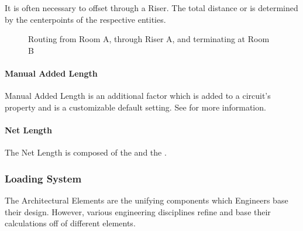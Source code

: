 \documentclass[letterpaper,10pt,english]{sphinxmanual}
\begin{document}
It is often necessary to offset through a Riser.  The total distance or {\hyperref[\detokenize{docs/userguide/index-user_guide:net-length}]{}} is determined by the centerpoints of the respective entities.

\begin{figure}[H]
\centering
\capstart

\noindent{}
\caption{Routing from Room A, through Riser A, and terminating at Room B}\label{\detokenize{docs/userguide/index-user_guide:id26}}\end{figure}


\paragraph{Manual Added Length}
\label{\detokenize{docs/userguide/index-user_guide:manual-added-length}}\label{\detokenize{docs/userguide/index-user_guide:id5}}
Manual Added Length is an additional factor which is added to a circuit’s {\hyperref[\detokenize{docs/userguide/index-user_guide:calculated-length}]{}} property and is a customizable default setting.  See {\hyperref[\detokenize{docs/userguide/projectsettings/defaultmodelparameters/index-default_model_parameters:default-model-parameters}]{}} for more information.


\paragraph{Net Length}
\label{\detokenize{docs/userguide/index-user_guide:net-length}}\label{\detokenize{docs/userguide/index-user_guide:id6}}
The Net Length is composed of the {\hyperref[\detokenize{docs/userguide/index-user_guide:calculated-length}]{}} and the {\hyperref[\detokenize{docs/userguide/index-user_guide:manual-added-length}]{}}.


\subsubsection{Loading System}
\label{\detokenize{docs/userguide/index-user_guide:loading-system}}
The Architectural Elements are the unifying components which Engineers base their design.  However, various engineering disciplines refine and base their calculations off of different elements.
\end{document}
